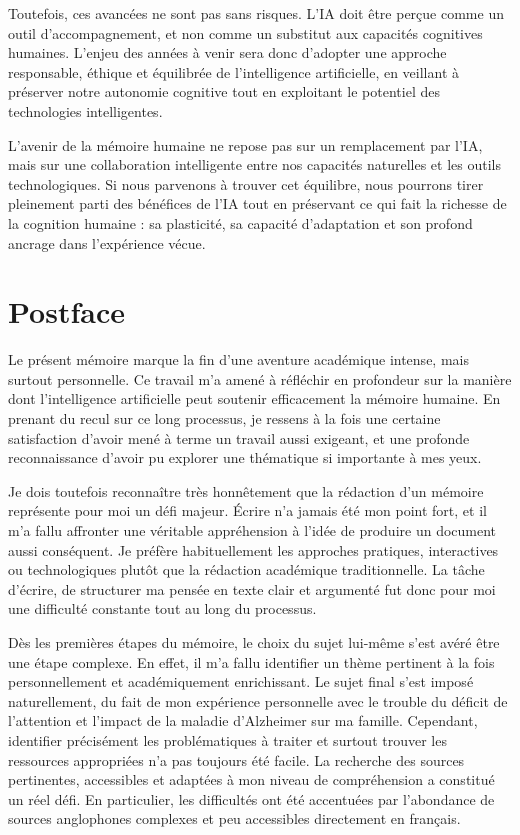 \documentclass[12pt,a4paper]{report}
\begin{document}
Toutefois, ces avancées ne sont pas sans risques. L’IA doit être perçue comme un outil d’accompagnement, et non comme un substitut aux capacités cognitives humaines. L’enjeu des années à venir sera donc d’adopter une approche responsable, éthique et équilibrée de l’intelligence artificielle, en veillant à préserver notre autonomie cognitive tout en exploitant le potentiel des technologies intelligentes.

L’avenir de la mémoire humaine ne repose pas sur un remplacement par l’IA, mais sur une collaboration intelligente entre nos capacités naturelles et les outils technologiques. Si nous parvenons à trouver cet équilibre, nous pourrons tirer pleinement parti des bénéfices de l’IA tout en préservant ce qui fait la richesse de la cognition humaine : sa plasticité, sa capacité d’adaptation et son profond ancrage dans l’expérience vécue.

\chapter*{Postface}

Le présent mémoire marque la fin d’une aventure académique intense, mais surtout personnelle. Ce travail m’a amené à réfléchir en profondeur sur la manière dont l’intelligence artificielle peut soutenir efficacement la mémoire humaine. En prenant du recul sur ce long processus, je ressens à la fois une certaine satisfaction d’avoir mené à terme un travail aussi exigeant, et une profonde reconnaissance d’avoir pu explorer une thématique si importante à mes yeux.

Je dois toutefois reconnaître très honnêtement que la rédaction d’un mémoire représente pour moi un défi majeur. Écrire n’a jamais été mon point fort, et il m’a fallu affronter une véritable appréhension à l’idée de produire un document aussi conséquent. Je préfère habituellement les approches pratiques, interactives ou technologiques plutôt que la rédaction académique traditionnelle. La tâche d’écrire, de structurer ma pensée en texte clair et argumenté fut donc pour moi une difficulté constante tout au long du processus.

Dès les premières étapes du mémoire, le choix du sujet lui-même s’est avéré être une étape complexe. En effet, il m’a fallu identifier un thème pertinent à la fois personnellement et académiquement enrichissant. Le sujet final s’est imposé naturellement, du fait de mon expérience personnelle avec le trouble du déficit de l’attention et l’impact de la maladie d’Alzheimer sur ma famille. Cependant, identifier précisément les problématiques à traiter et surtout trouver les ressources appropriées n’a pas toujours été facile. La recherche des sources pertinentes, accessibles et adaptées à mon niveau de compréhension a constitué un réel défi. En particulier, les difficultés ont été accentuées par l’abondance de sources anglophones complexes et peu accessibles directement en français.
\end{document}
